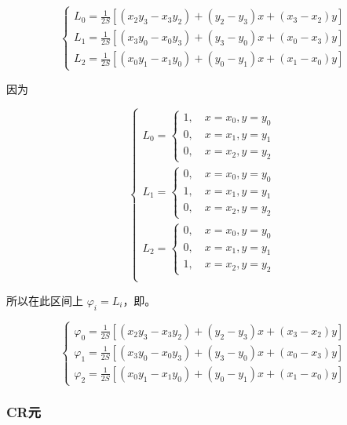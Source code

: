 \documentclass[a4paper,UTF8,titlepage]{ctexart}
\begin{document}
$$
\begin{cases}
	L_0 = \frac{1}{2S} [(x_2 y_3 - x_3 y_2) + (y_2 - y_3) x + (x_3 - x_2) y] \\
	L_1 = \frac{1}{2S} [(x_3 y_0 - x_0 y_3) + (y_3 - y_0) x + (x_0 - x_3) y] \\
	L_2 = \frac{1}{2S} [(x_0 y_1 - x_1 y_0) + (y_0 - y_1) x + (x_1 - x_0) y]
\end{cases} 
$$

因为

$$
\begin{cases}
	L_0 = \begin{cases}
		1, \quad x = x_0, y = y_0 \\
		0, \quad x = x_1, y = y_1 \\
		0, \quad x = x_2, y = y_2
	\end{cases} \\
	L_1 = \begin{cases}
		0, \quad x = x_0, y = y_0 \\
		1, \quad x = x_1, y = y_1 \\
		0, \quad x = x_2, y = y_2
	\end{cases} \\
	L_2 = \begin{cases}
		0, \quad x = x_0, y = y_0 \\
		0, \quad x = x_1, y = y_1 \\
		1, \quad x = x_2, y = y_2
	\end{cases} \\
\end{cases}
$$

所以在此区间上 $\varphi_i = L_i$，即。

$$
\begin{cases}
	\varphi_0 = \frac{1}{2S} [(x_2 y_3 - x_3 y_2) + (y_2 - y_3) x + (x_3 - x_2) y] \\
	\varphi_1 = \frac{1}{2S} [(x_3 y_0 - x_0 y_3) + (y_3 - y_0) x + (x_0 - x_3) y] \\
	\varphi_2 = \frac{1}{2S} [(x_0 y_1 - x_1 y_0) + (y_0 - y_1) x + (x_1 - x_0) y]
\end{cases} 
$$


\subsubsection{CR元}
\end{document}
